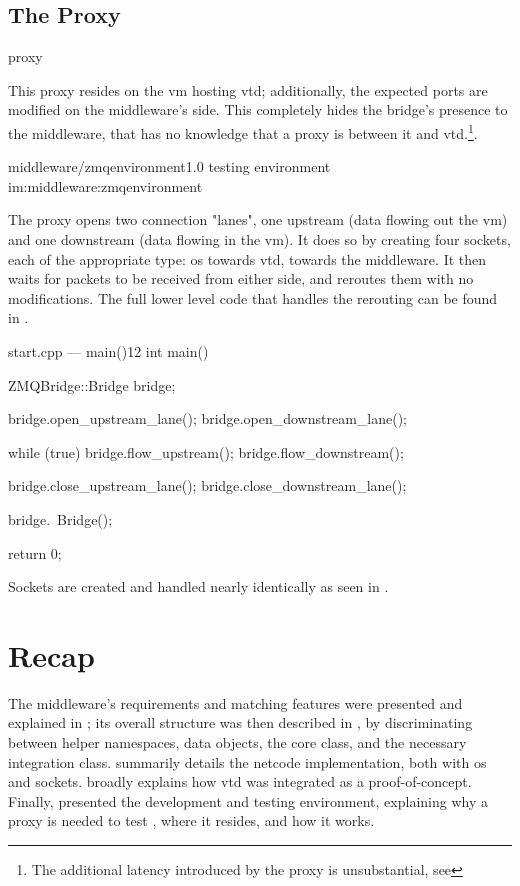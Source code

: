 \subsection{The Proxy}

\begin{definition}{proxy}
\end{definition}

This \gls{proxy} resides on the \gls{vm} hosting \gls{vtd}; additionally, the expected ports are modified on the \gls{middleware}'s side. This completely hides the bridge's presence to the \gls{middleware}, that has no knowledge that a \gls{proxy} is between it and \gls{vtd}.\footnote{The additional latency introduced by the \gls{proxy} is unsubstantial, see }.

\begin{image}
	{middleware/zmqenvironment}{1.0}
	{ testing environment}
	{im:middleware:zmqenvironment}
	{}
\end{image}

The \gls{proxy} opens two connection "lanes", one upstream (data flowing out the \gls{vm}) and one downstream (data flowing in the \gls{vm}). It does so by creating four sockets, each of the appropriate type: \gls{os} towards \gls{vtd},  towards the \gls{middleware}. It then waits for \glspl{packet} to be received from either side, and reroutes them with no modifications. The full lower level code that handles the rerouting can be found in .

\begin{codelist}{start.cpp --- main()}{12}
int main() {
	ZMQBridge::Bridge bridge;

	bridge.open_upstream_lane();
	bridge.open_downstream_lane();

	while (true) {
		bridge.flow_upstream();
		bridge.flow_downstream();
	}

	bridge.close_upstream_lane();
	bridge.close_downstream_lane();

	bridge.~Bridge();

	return 0;
}
\end{codelist}

Sockets are created and handled nearly identically as seen in .

\section{Recap}\label{sc:middleware:recap}

The \gls{middleware}'s requirements and matching features were presented and explained in ; its overall structure was then described in , by discriminating between helper namespaces, data objects, the core class, and the necessary integration class.  summarily details the \gls{netcode} implementation, both with \gls{os} and  sockets.  broadly explains how \gls{vtd} was integrated as a proof-of-concept. Finally,  presented the development and testing environment, explaining why a \gls{proxy} is needed to test , where it resides, and how it works.
